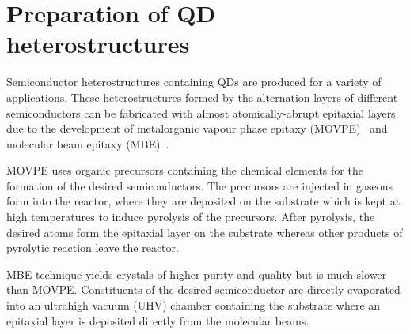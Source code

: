 \documentclass[
a4paper, %
11pt, %
onecolumn, %
openany, %
oldfontcommands,
]{memoir}
\begin{document}
\section{Preparation of QD heterostructures}
Semiconductor heterostructures containing QDs are produced for a variety of applications. These heterostructures formed by the alternation layers of different semiconductors can be fabricated with almost atomically-abrupt epitaxial layers due to the development of metalorganic vapour phase epitaxy (MOVPE)~\cite{Stringfellow,MOVPE_May} and molecular beam epitaxy (MBE)~\cite{Stringfellow,MOVPE_May}.

MOVPE uses organic precursors containing the chemical elements for the formation of the desired semiconductors. The precursors are injected in gaseous form into the reactor, where they are deposited on the substrate which is kept at high temperatures to induce pyrolysis of the precursors. After pyrolysis, the desired atoms form the epitaxial layer on the substrate whereas other products of pyrolytic reaction leave the reactor.



MBE technique yields crystals of higher purity and quality but is much slower than MOVPE. Constituents of the desired semiconductor are directly evaporated into an ultrahigh vacuum (UHV) chamber containing the substrate where an epitaxial layer is deposited directly from the molecular beams.
\end{document}

